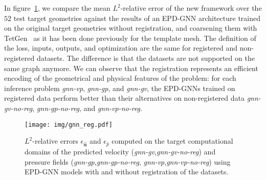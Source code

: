 In figure~\ref{fig:epdgnn_reg_no_reg}, we compare the mean $L^2$-relative error of the new framework over the $52$ test target geometries against the results of an EPD-GNN architecture trained on the original target geometries without registration, and coarsening them with TetGen~\cite{Si2015} as it has been done previously for the template mesh. The definition of the loss, inputs, outputs, and optimization are the same for registered and non-registered datasets. The difference is that the datasets are not supported on the same graph anymore. 
We can observe that the registration represents an efficient encoding of the geometrical and physical features of the problem: for each inference problem \textit{gnn-vp}, \textit{gnn-gp}, and \textit{gnn-gv}, the EPD-GNNs trained on registered data perform better than their alternatives on non-registered data \textit{gnn-gv-no-reg}, \textit{gnn-gp-no-reg}, and \textit{gnn-vp-no-reg}.


\begin{figure}[!htp]
  \centering
  \texttt{[image: img/gnn\_reg.pdf]}
  \caption{$L^2$-relative errors $\epsilon_{\widehat{\mathbf{u}}}$ and $\epsilon_{\widehat{p}}$ computed on the target computational domains of the predicted velocity (\textit{gnn-gv},\textit{gnn-gv-no-reg}) and pressure fields (\textit{gnn-gp},\textit{gnn-gp-no-reg}, \textit{gnn-vp},\textit{gnn-vp-no-reg}) using EPD-GNN models with and without registration of the datasets.}
  \label{fig:epdgnn_reg_no_reg}
\end{figure}